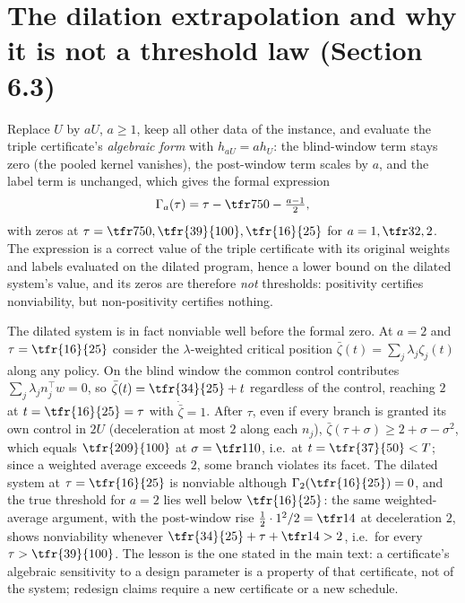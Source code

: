 \section{The dilation extrapolation and why it is not a threshold law (Section 6.3)}\label{S:dilation}

Replace $U$ by $aU$, $a\ge1$, keep all other data of the instance, and evaluate the triple certificate's \emph{algebraic form} with $h_{aU}=ah_U$: the blind-window term stays zero (the pooled kernel vanishes), the post-window term scales by $a$, and the label term is unchanged, which gives the formal expression
\[
\Gamma_a(\tau)=\tau-\tfr7{50}-\tfrac{a-1}2 ,
\]
with zeros at $\tau=\tfr7{50},\tfr{39}{100},\tfr{16}{25}$ for $a=1,\tfr32,2$. The expression is a correct value of the triple certificate with its original weights and labels evaluated on the dilated program, hence a lower bound on the dilated system's value, and its zeros are therefore \emph{not} thresholds: positivity certifies nonviability, but non-positivity certifies nothing.

The dilated system is in fact nonviable well before the formal zero. At $a=2$ and $\tau=\tfr{16}{25}$ consider the $\lambda$-weighted critical position $\bar\zeta(t)=\sum_j\lambda_j\zeta_j(t)$ along any policy. On the blind window the common control contributes $\sum_j\lambda_jn_j^\top w=0$, so $\bar\zeta(t)=\tfr{34}{25}+t$ regardless of the control, reaching $2$ at $t=\tfr{16}{25}=\tau$ with $\dot{\bar\zeta}=1$. After $\tau$, even if every branch is granted its own control in $2U$ (deceleration at most $2$ along each $n_j$), $\bar\zeta(\tau+\sigma)\ge2+\sigma-\sigma^2$, which equals $\tfr{209}{100}$ at $\sigma=\tfr1{10}$, i.e.\ at $t=\tfr{37}{50}<T$; since a weighted average exceeds $2$, some branch violates its facet. The dilated system at $\tau=\tfr{16}{25}$ is nonviable although $\Gamma_2(\tfr{16}{25})=0$, and the true threshold for $a=2$ lies well below $\tfr{16}{25}$: the same weighted-average argument, with the post-window rise $\tfrac12\cdot1^2/2=\tfr14$ at deceleration $2$, shows nonviability whenever $\tfr{34}{25}+\tau+\tfr14>2$, i.e.\ for every $\tau>\tfr{39}{100}$. The lesson is the one stated in the main text: a certificate's algebraic sensitivity to a design parameter is a property of that certificate, not of the system; redesign claims require a new certificate or a new schedule.
